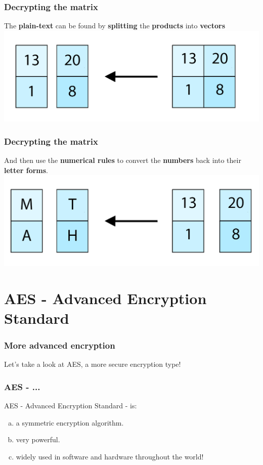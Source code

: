 \documentclass[11pt]{beamer}
\begin{document}
\begin{frame}\frametitle{Decrypting the matrix}

The \textbf{plain-text} can be found by \textbf{splitting} the \textbf{products} into \textbf{vectors}
\center \includegraphics[scale=0.2]{linear_2}

\end{frame}

\begin{frame}\frametitle{Decrypting the matrix}

And then use the \textbf{numerical rules} to convert the \textbf{numbers} back into their \textbf{letter forms}.
\center \includegraphics[scale=0.2]{math_2}

\end{frame}

\section{AES - Advanced Encryption Standard}
\begin{frame}\frametitle{More advanced encryption}
\center Let's take a look at AES, a more secure encryption type!
\end{frame}

\begin{frame}\frametitle{AES - ...}
	AES - Advanced Encryption Standard - is: 
	\begin{enumerate}[a.]
	\item a symmetric encryption algorithm.
	\item very powerful.
	\item widely used in software and hardware throughout the world! 
	\end{enumerate}
\end{frame}
\end{document}
